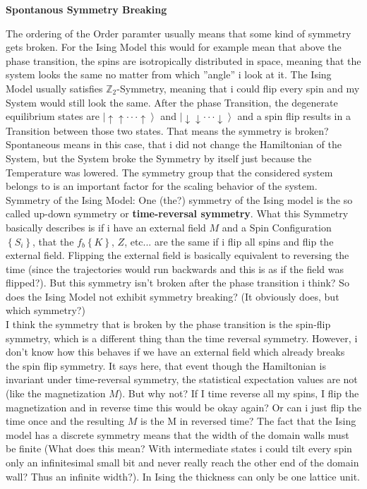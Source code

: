 		\newline
		\newline
		\textbf{Spontanous Symmetry Breaking}
		
		The ordering of the Order paramter usually means that some kind of symmetry gets broken. For the Ising Model this would for example mean that above the phase transition, the spins are isotropically distributed in space, meaning that the system looks the same no matter from which ''angle'' i look at it. The Ising Model usually satisfies $\mathbb{Z}_2$-Symmetry, meaning that i could flip every spin and my System would still look the same. After the phase Transition, the degenerate equilibrium states are $\left|\uparrow \uparrow \cdot \cdot \cdot \uparrow \right\rangle$ and $\left|\downarrow \downarrow \cdot \cdot \cdot \downarrow \right\rangle$ and a spin flip results in a Transition between those two states. That means the symmetry is broken? Spontaneous means in this case, that i did not change the Hamiltonian of the System, but the System broke the Symmetry by itself just because the Temperature was lowered. The symmetry group that the considered system belongs to is an important factor for the scaling behavior of the system. \\

		Symmetry of the Ising Model: One (the?) symmetry of the Ising model is the so called up-down symmetry or \textbf{time-reversal symmetry}. What this Symmetry basically describes is if i have an external field $M$ and a Spin Configuration $\left\lbrace S_i \right\rbrace$, that the $f_b\left\lbrace K \right\rbrace$, $Z$, etc... are the same if i flip all spins and flip the external field. Flipping the external field is basically equivalent to reversing the time (since the trajectories would run backwards and this is as if the field was flipped?). But this symmetry isn't broken after the phase transition i think? So does the Ising Model not exhibit symmetry breaking? (It obviously does, but which symmetry?) \\
		
		I think the symmetry that is broken by the phase transition is the spin-flip symmetry, which is a different thing than the time reversal symmetry. However, i don't know how this behaves if we have an external field which already breaks the spin flip symmetry. It says here, that event though the Hamiltonian is invariant under time-reversal symmetry, the statistical expectation values are not (like the magnetization $M$). But why not? If I time reverse all my spins, I flip the magnetization and in reverse time this would be okay again? Or can i just flip the time once and the resulting $M$ is the M in reversed time? The fact that the Ising model has a discrete symmetry means that the width of the domain walls must be finite (What does this mean? With intermediate states i could tilt every spin only an infinitesimal small bit and never really reach the other end of the domain wall? Thus an infinite width?). In Ising the thickness can only be one lattice unit. \\
		
